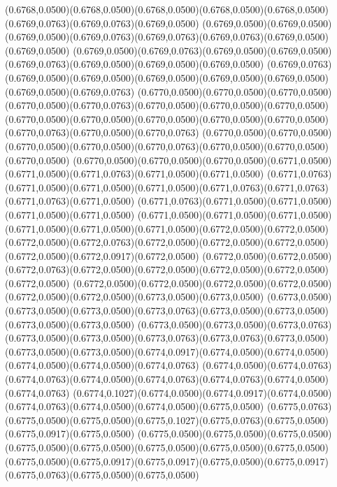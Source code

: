 (0.6768,0.0500)(0.6768,0.0500)(0.6768,0.0500)(0.6768,0.0500)(0.6768,0.0500)(0.6769,0.0763)(0.6769,0.0763)(0.6769,0.0500)
(0.6769,0.0500)(0.6769,0.0500)(0.6769,0.0500)(0.6769,0.0763)(0.6769,0.0763)(0.6769,0.0763)(0.6769,0.0500)(0.6769,0.0500)
(0.6769,0.0500)(0.6769,0.0763)(0.6769,0.0500)(0.6769,0.0500)(0.6769,0.0763)(0.6769,0.0500)(0.6769,0.0500)(0.6769,0.0500)
(0.6769,0.0763)(0.6769,0.0500)(0.6769,0.0500)(0.6769,0.0500)(0.6769,0.0500)(0.6769,0.0500)(0.6769,0.0500)(0.6769,0.0763)
(0.6770,0.0500)(0.6770,0.0500)(0.6770,0.0500)(0.6770,0.0500)(0.6770,0.0763)(0.6770,0.0500)(0.6770,0.0500)(0.6770,0.0500)
(0.6770,0.0500)(0.6770,0.0500)(0.6770,0.0500)(0.6770,0.0500)(0.6770,0.0500)(0.6770,0.0763)(0.6770,0.0500)(0.6770,0.0763)
(0.6770,0.0500)(0.6770,0.0500)(0.6770,0.0500)(0.6770,0.0500)(0.6770,0.0763)(0.6770,0.0500)(0.6770,0.0500)(0.6770,0.0500)
(0.6770,0.0500)(0.6770,0.0500)(0.6770,0.0500)(0.6771,0.0500)(0.6771,0.0500)(0.6771,0.0763)(0.6771,0.0500)(0.6771,0.0500)
(0.6771,0.0763)(0.6771,0.0500)(0.6771,0.0500)(0.6771,0.0500)(0.6771,0.0763)(0.6771,0.0763)(0.6771,0.0763)(0.6771,0.0500)
(0.6771,0.0763)(0.6771,0.0500)(0.6771,0.0500)(0.6771,0.0500)(0.6771,0.0500)
\PST@Solid(0.6771,0.0500)(0.6771,0.0500)(0.6771,0.0500)(0.6771,0.0500)(0.6771,0.0500)(0.6771,0.0500)(0.6772,0.0500)(0.6772,0.0500)
(0.6772,0.0500)(0.6772,0.0763)(0.6772,0.0500)(0.6772,0.0500)(0.6772,0.0500)(0.6772,0.0500)(0.6772,0.0917)(0.6772,0.0500)
(0.6772,0.0500)(0.6772,0.0500)(0.6772,0.0763)(0.6772,0.0500)(0.6772,0.0500)(0.6772,0.0500)(0.6772,0.0500)(0.6772,0.0500)
(0.6772,0.0500)(0.6772,0.0500)(0.6772,0.0500)(0.6772,0.0500)(0.6772,0.0500)(0.6772,0.0500)(0.6773,0.0500)(0.6773,0.0500)
(0.6773,0.0500)(0.6773,0.0500)(0.6773,0.0500)(0.6773,0.0763)(0.6773,0.0500)(0.6773,0.0500)(0.6773,0.0500)(0.6773,0.0500)
(0.6773,0.0500)(0.6773,0.0500)(0.6773,0.0763)(0.6773,0.0500)(0.6773,0.0500)(0.6773,0.0763)(0.6773,0.0763)(0.6773,0.0500)
(0.6773,0.0500)(0.6773,0.0500)(0.6774,0.0917)(0.6774,0.0500)(0.6774,0.0500)(0.6774,0.0500)(0.6774,0.0500)(0.6774,0.0763)
(0.6774,0.0500)(0.6774,0.0763)(0.6774,0.0763)(0.6774,0.0500)(0.6774,0.0763)(0.6774,0.0763)(0.6774,0.0500)(0.6774,0.0763)
(0.6774,0.1027)(0.6774,0.0500)(0.6774,0.0917)(0.6774,0.0500)(0.6774,0.0763)(0.6774,0.0500)(0.6774,0.0500)(0.6775,0.0500)
(0.6775,0.0763)(0.6775,0.0500)(0.6775,0.0500)(0.6775,0.1027)(0.6775,0.0763)(0.6775,0.0500)(0.6775,0.0917)(0.6775,0.0500)
(0.6775,0.0500)(0.6775,0.0500)(0.6775,0.0500)(0.6775,0.0500)(0.6775,0.0500)(0.6775,0.0500)(0.6775,0.0500)(0.6775,0.0500)
(0.6775,0.0500)(0.6775,0.0917)(0.6775,0.0917)(0.6775,0.0500)(0.6775,0.0917)(0.6775,0.0763)(0.6775,0.0500)(0.6775,0.0500)
